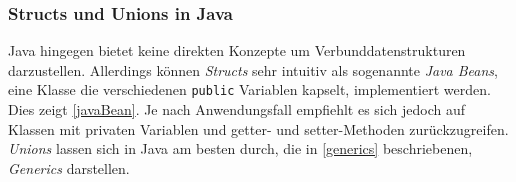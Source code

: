 \subsubsection*{Structs und Unions in Java}

Java hingegen bietet keine direkten Konzepte um Verbunddatenstrukturen darzustellen. Allerdings können \textit{Structs} sehr intuitiv als sogenannte \textit{Java Beans}, eine Klasse die verschiedenen \texttt{public} Variablen kapselt, implementiert werden. Dies zeigt \autoref{javaBean}. Je nach Anwendungsfall empfiehlt es sich jedoch auf Klassen mit privaten Variablen und getter- und setter-Methoden zurückzugreifen. \textit{Unions} lassen sich in Java am besten durch, die in \autoref{generics} beschriebenen, \textit{Generics} darstellen.

